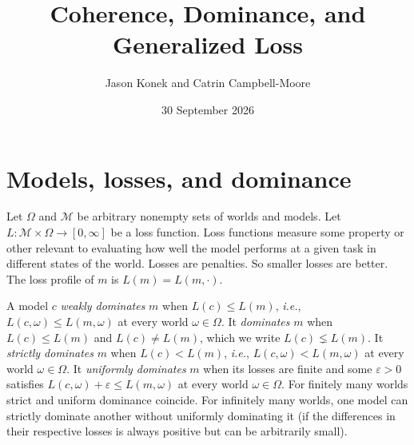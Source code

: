 \documentclass[11pt]{article}
\title{Coherence, Dominance, and Generalized Loss}
\author{Jason Konek and Catrin Campbell-Moore}
\date{30 September 2026}
\theoremstyle{definition}
\theoremstyle{remark}
\newcommand{\M}{\mathcal M}
\newcommand{\C}{\mathcal C}
\newcommand{\U}{\mathcal U}
\begin{document}
\maketitle


\section{Models, losses, and dominance}\label{sec:setting}
Let $\Omega$ and $\M$ be arbitrary nonempty sets of worlds and models. Let $L:\M\times\Omega\to[0,\infty]$ be a loss function. Loss functions measure some property or other relevant to evaluating how well the model performs at a given task in different states of the world. Losses are penalties. So smaller losses are better. The loss profile of $m$ is $L(m)=L(m,\cdot)$. %

A model $c$ \emph{weakly dominates} $m$ when $L(c)\le L(m)$, \textit{i.e.}, $L(c,\omega)\le L(m,\omega)$ at every world $\omega\in\Omega$. It \emph{dominates} $m$ when $L(c)\le L(m)$ and $L(c)\neq L(m)$, which we write $L(c)\lneq L(m)$. It \emph{strictly dominates} $m$ when $L(c)< L(m)$, \textit{i.e.}, $L(c,\omega)< L(m,\omega)$ at every world $\omega\in\Omega$. It \emph{uniformly dominates} $m$ when its losses are finite and some $\varepsilon>0$ satisfies $L(c,\omega)+\varepsilon\le L(m,\omega)$ at every world $\omega\in\Omega$. For finitely many worlds strict and uniform dominance coincide. For infinitely many worlds, one model can strictly dominate another without uniformly dominating it (if the differences in their respective losses is always positive but can be arbitrarily small).


\end{document}
